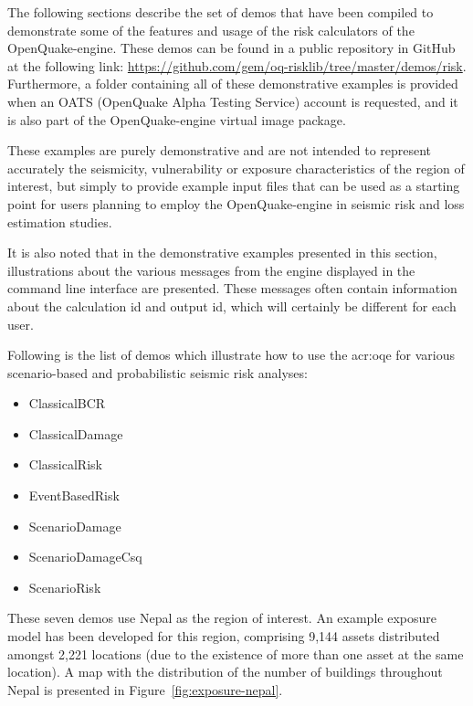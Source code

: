 The following sections describe the set of demos that have been compiled to
demonstrate some of the features and usage of the risk calculators of the
OpenQuake-engine. These demos can be found in a public repository in GitHub at
the following link:
\href{https://github.com/gem/oq-risklib/tree/master/demos/risk}
{https://github.com/gem/oq-risklib/tree/master/demos/risk}.
Furthermore, a folder containing all of these
demonstrative examples is provided when an OATS (OpenQuake Alpha Testing
Service) account is requested, and it is also part of the OpenQuake-engine
virtual image package.

These examples are purely demonstrative and are not intended to represent
accurately the seismicity, vulnerability or exposure characteristics of the
region of interest, but simply to provide example input files that can be used
as a starting point for users planning to employ the OpenQuake-engine in seismic
risk and loss estimation studies.

It is also noted that in the demonstrative examples presented in this section,
illustrations about the various messages from the engine displayed in the
command line interface are presented. These messages often contain information
about the calculation id and output id, which will certainly be different for
each user.

Following is the list of demos which illustrate how to use the \gls{acr:oqe} for
various scenario-based and probabilistic seismic risk analyses:

\begin{itemize}

    \item ClassicalBCR
	\item ClassicalDamage
    \item ClassicalRisk
    \item EventBasedRisk
    \item ScenarioDamage
    \item ScenarioDamageCsq
    \item ScenarioRisk

\end{itemize}

These seven demos use Nepal as the region of interest. An example \gls{exposure
model} has been developed for this region, comprising 9,144 assets distributed
amongst 2,221 locations (due to the existence of more than one \gls{asset} at
the same location). A map with the distribution of the number of buildings
throughout Nepal is presented in Figure~\ref{fig:exposure-nepal}.

